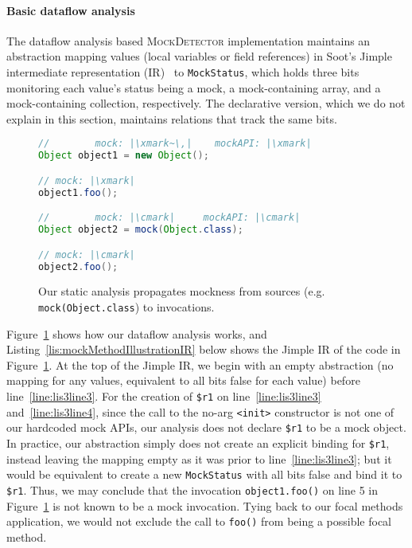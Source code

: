 \paragraph{Basic dataflow analysis} The dataflow analysis based \textsc{MockDetector} implementation maintains an abstraction mapping values (local variables or field references) in Soot's Jimple intermediate representation (IR)~\cite{Vallee-Rai:1999:SJB:781995.782008} to \texttt{MockStatus}, which holds three bits monitoring each value's status being a mock, a mock-containing array, and a mock-containing collection, respectively. The declarative version, which we do not explain in this section, maintains relations that track the same bits.

\begin{figure}
\begin{lstlisting}[basicstyle=\ttfamily,
basicstyle=\scriptsize\ttfamily,language = Java, framesep=4.5mm, framexleftmargin=1.0mm, captionpos=b, escapechar=|, morekeywords={@Test}]
//        mock: |\xmark~\,|    mockAPI: |\xmark|
Object object1 = new Object();

// mock: |\xmark|
object1.foo();

//        mock: |\cmark|     mockAPI: |\cmark|
Object object2 = mock(Object.class);

// mock: |\cmark|
object2.foo();
\end{lstlisting}
    
    \caption{Our static analysis propagates mockness from sources (e.g. \texttt{mock(Object.class}) to invocations.}
    \label{fig:mockMethodIllustration}
    
\end{figure}

Figure~\ref{fig:mockMethodIllustration} shows how our dataflow analysis works, and Listing~\ref{lis:mockMethodIllustrationIR} below shows the Jimple IR of the code in Figure~\ref{fig:mockMethodIllustration}. At the top of the Jimple IR, we begin with an empty abstraction (no mapping for any values, equivalent to all bits false for each value) before line~\ref{line:lis3line3}. For the creation of \texttt{\$r1} on line~\ref{line:lis3line3} and~\ref{line:lis3line4}, since the call to the no-arg \texttt{<init>} constructor is not one of our hardcoded mock APIs, our analysis does not declare \texttt{\$r1} to be a mock object. In practice, our abstraction simply does not create an explicit binding for \texttt{\$r1}, instead leaving the mapping empty as it was prior to line~\ref{line:lis3line3}; but it would be equivalent to create a new \texttt{MockStatus} with all bits false and bind it to \texttt{\$r1}. Thus, we may conclude that the invocation \texttt{object1.foo()} on line 5 in Figure~\ref{fig:mockMethodIllustration} is not known to be a mock invocation. Tying back to our focal methods application, we would not exclude the call to \texttt{foo()} from being a possible focal method.

